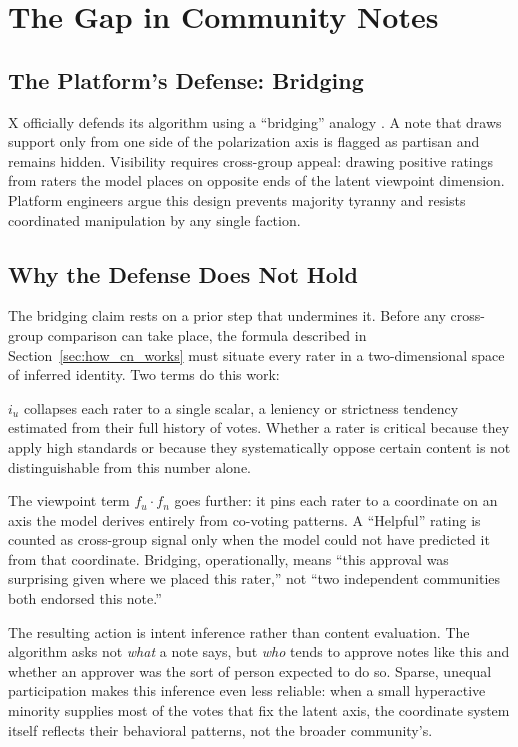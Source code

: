 \documentclass[10pt,twocolumn]{article}
\begin{document}
\section{The Gap in Community Notes}
\label{sec:the_gap}

\subsection*{The Platform's Defense: Bridging}
X officially defends its algorithm using a ``bridging'' analogy \cite{xcommunitynotes2026ranking}. A note that draws support only from one side of the polarization axis is flagged as partisan and remains hidden. Visibility requires cross-group appeal: drawing positive ratings from raters the model places on opposite ends of the latent viewpoint dimension. Platform engineers argue this design prevents majority tyranny and resists coordinated manipulation by any single faction.

\subsection*{Why the Defense Does Not Hold}
The bridging claim rests on a prior step that undermines it. Before any cross-group comparison can take place, the formula described in Section~\ref{sec:how_cn_works} must situate every rater in a two-dimensional space of inferred identity. Two terms do this work:

$i_u$ collapses each rater to a single scalar, a leniency or strictness tendency estimated from their full history of votes. Whether a rater is critical because they apply high standards or because they systematically oppose certain content is not distinguishable from this number alone.

The viewpoint term $f_u \cdot f_n$ goes further: it pins each rater to a coordinate on an axis the model derives entirely from co-voting patterns. A ``Helpful'' rating is counted as cross-group signal only when the model could not have predicted it from that coordinate. Bridging, operationally, means ``this approval was surprising given where we placed this rater,'' not ``two independent communities both endorsed this note.''

The resulting action is intent inference rather than content evaluation. The algorithm asks not \textit{what} a note says, but \textit{who} tends to approve notes like this and whether an approver was the sort of person expected to do so. Sparse, unequal participation makes this inference even less reliable: when a small hyperactive minority supplies most of the votes that fix the latent axis, the coordinate system itself reflects their behavioral patterns, not the broader community's.
\end{document}
